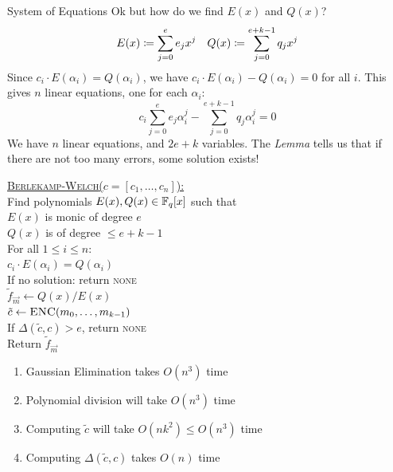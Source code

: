 \documentclass[aspectratio=169]{beamer}
\begin{document}
\begin{frame}{System of Equations}
    Ok but how do we find $E(x)$ and $Q(x)$? \pause
    \begin{align*}
        E(x) \coloneqq \sum_{j = 0}^{e} e_j x^j && Q(x) \coloneqq \sum_{j = 0}^{e +k - 1} q_j x^j
    \end{align*}
    Since $c_i \cdot E(\alpha_i) = Q(\alpha_i)$, we have $c_i \cdot E(\alpha_i) - Q(\alpha_i) = 0$ for all $i$. \pause
    This gives $n$ linear equations, one for each $\alpha_i$:
    \[
        c_i \sum_{j = 0}^{e} e_j \alpha_i^j - \sum_{j = 0}^{e + k - 1} q_j \alpha_i^j = 0
    \]
    We have $n$ linear equations, and $2e + k$ variables.
    The \emph{Lemma} tells us that if there are not too many errors, some solution exists!
\end{frame}

\begin{frame}
    \begin{algo}
    \ul{\textsc{Berlekamp-Welch}($c = [c_1, \ldots, c_n]$):}
    \\  Find polynomials $E(x), Q(x) \in \mathbb{F}_q[x]$ such that\+
    \\      $E(x)$ is monic of degree $e$
    \\      $Q(x)$ is of degree $\leq e + k - 1$
    \\      For all $1 \leq i \leq n$:\+
    \\          $c_i \cdot E(\alpha_i) = Q(\alpha_i)$\-\-
    \\  If no solution: return \textsc{none}
    \\  $\widetilde{f}_{\vec{m}} \gets Q(x) / E(x)$
    \\  $\tilde{c} \gets \textsc{ENC}(m_0, \ldots, m_{k - 1})$
    \\  If $\Delta(\tilde{c}, c) > e$, return \textsc{none}
    \\  Return $\widetilde{f}_{\vec{m}}$
    \end{algo}\pause
    \begin{enumerate}
        \item Gaussian Elimination takes $O(n^3)$ time \pause
        \item Polynomial division will take $O(n^3)$ time \pause
        \item Computing $\tilde{c}$ will take $O(nk^2) \leq O(n^3)$ time \pause
        \item Computing $\Delta(\tilde{c}, c)$ takes $O(n)$ time
    \end{enumerate}
\end{frame}
\end{document}
